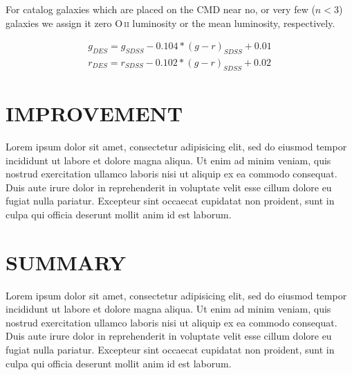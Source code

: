 \documentclass[apj, revtex4]{emulateapj}
\makeatletter
\DeclareRobustCommand{\ion}[2]{%
\relax\ifmmode
\ifx\testbx\f@series
{\mathbf{#1\,\mathsc{#2}}}\else
{\mathrm{#1\,\mathsc{#2}}}\fi
\else\textup{#1\,{\mdseries\textsc{#2}}}%
\fi}
\makeatother
\begin{document}
For catalog galaxies which are placed on the CMD near no, or very few ($n<3$) galaxies we assign it zero \ion{O}{ii} luminosity or the mean luminosity, respectively.

\begin{eqnarray}
	g_{DES} = g_{SDSS} - 0.104*(g-r)_{SDSS} + 0.01 \\
	r_{DES} = r_{SDSS} - 0.102*(g-r)_{SDSS} + 0.02
\end{eqnarray}
	

\section{IMPROVEMENT}
Lorem ipsum dolor sit amet, consectetur adipisicing elit, sed do eiusmod tempor incididunt ut labore et dolore magna aliqua. Ut enim ad minim veniam, quis nostrud exercitation ullamco laboris nisi ut aliquip ex ea commodo consequat. Duis aute irure dolor in reprehenderit in voluptate velit esse cillum dolore eu fugiat nulla pariatur. Excepteur sint occaecat cupidatat non proident, sunt in culpa qui officia deserunt mollit anim id est laborum.

\section{SUMMARY}
Lorem ipsum dolor sit amet, consectetur adipisicing elit, sed do eiusmod tempor incididunt ut labore et dolore magna aliqua. Ut enim ad minim veniam, quis nostrud exercitation ullamco laboris nisi ut aliquip ex ea commodo consequat. Duis aute irure dolor in reprehenderit in voluptate velit esse cillum dolore eu fugiat nulla pariatur. Excepteur sint occaecat cupidatat non proident, sunt in culpa qui officia deserunt mollit anim id est laborum.

\end{document}
